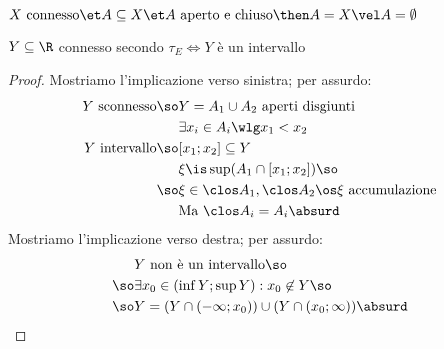 \begin{prop}
$X\text{ connesso}\et A\subseteq X\et A\text{ aperto e chiuso}\then A=X\vel A=\emptyset$
\end{prop}

\begin{prop}
$Y\subseteq\R$ connesso secondo $\tau_E\iff Y$ è un intervallo
\end{prop}
\begin{proof}
Mostriamo l'implicazione verso sinistra; per assurdo:
\begin{align*}
Y\text{ sconnesso}\so&Y=A_1\cup A_2\text{ aperti disgiunti}\\
&\exists x_i\in A_i\wlg x_1<x_2\\
Y\text{ intervallo}\so&[x_1;x_2]\subseteq Y\\
&\xi\is\sup(A_1\cap[x_1;x_2])\so\\
\so&\xi\in\clos A_1,\clos A_2\os\xi\text{ accumulazione}\\
&\text{Ma }\clos A_i=A_i\absurd
\end{align*}
Mostriamo l'implicazione verso destra; per assurdo:
\begin{align*}
&Y\text{ non è un intervallo}\so\\
\so&\exists x_0\in(\inf Y;\sup Y):x_0\not\in Y\so\\
\so&Y=(Y\cap(-\infty;x_0))\cup(Y\cap(x_0;\infty))\absurd
\end{align*}
\end{proof}
